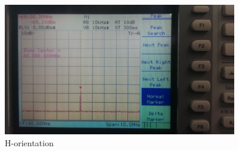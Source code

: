 \begin{figure}[h]
	\begin{center}
		\includegraphics[width=4in]{./images/Figure10.jpg}
		\caption{H-orientation}
		\label{fig:hfield_fig11}
	\end{center}
\end{figure}

